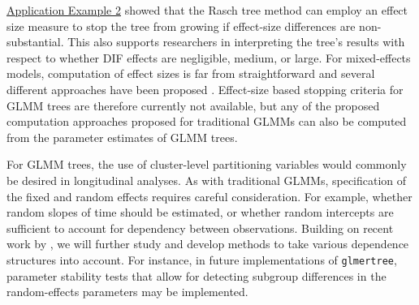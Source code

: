 \documentclass[doc,floatsintext,natbib]{apa7}
\begin{document}
\hyperref[sec:TutorialRasch]{Application Example 2} showed that the Rasch tree method can employ an effect size measure to stop the tree from growing if effect-size differences are non-substantial. This also supports researchers in interpreting the tree's results with respect to whether DIF effects are negligible, medium, or large. For mixed-effects models, computation of effect sizes is far from straightforward and several different approaches have been proposed \citep[e.g., ][]{JuddyWest17, BrysyStev18, Bran18}. Effect-size based stopping criteria for GLMM trees are therefore currently not available, but any of the proposed computation approaches proposed for traditional GLMMs can also be computed from the parameter estimates of GLMM trees.



For GLMM trees, the use of cluster-level partitioning variables would commonly be desired in longitudinal analyses. As with traditional GLMMs, specification of the fixed and random effects requires careful consideration. For example, whether random slopes of time should be estimated, or whether random intercepts are sufficient to account for dependency between observations. Building on recent work by \citet{FokkyZeil24}, we will further study and develop methods to take various dependence structures into account. For instance, in future implementations of \texttt{glmertree}, parameter stability tests that allow for detecting subgroup differences in the random-effects parameters \citep{Wang2021a} may be implemented.

\end{document}
